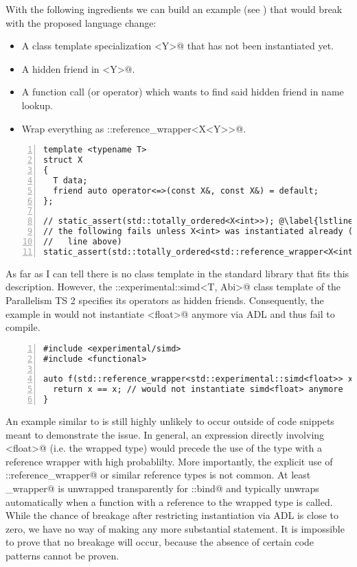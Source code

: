 With the following ingredients we can build an example (see ) that 
would break with the proposed language change:
\begin{itemize}
\item A class template specialization \codelst@X<Y>@ that has not been instantiated yet.
\item A hidden friend in \codelst@X<Y>@.
\item A function call (or operator) which wants to find said hidden friend in name lookup.
\item Wrap everything as \codelst@std::reference_wrapper<X<Y>>@.
\end{itemize}
\begin{lstlisting}[numbers=left,float={hbtp},label=lst:refwrapperproblem,caption={
\code{std::reference_wrapper} example which would fail unless 
line~\ref{lstline:refwrapperproblem0} is uncommented
}]
template <typename T>
struct X
{
  T data;
  friend auto operator<=>(const X&, const X&) = default;
};

// static_assert(std::totally_ordered<X<int>>); @\label{lstline:refwrapperproblem0}@
// the following fails unless X<int> was instantiated already (e.g. with the
//   line above)
static_assert(std::totally_ordered<std::reference_wrapper<X<int>>>);
\end{lstlisting}

As far as I can tell there is no class template in the standard library that fits this 
description. However, the \codelst@std::experimental::simd<T, Abi>@ class template of the 
Parallelism TS 2 specifies its operators as hidden friends. Consequently, the example in 
 would not instantiate \codelst@simd<float>@ anymore via ADL and thus 
fail to compile.
\begin{lstlisting}[numbers=left,float={hbtp},label=lst:refwrappersimd,caption={
Regression when combining \code{std::reference_wrapper} with 
\code{std::experimental::simd}.
}]
#include <experimental/simd>
#include <functional>

auto f(std::reference_wrapper<std::experimental::simd<float>> x) {
  return x == x; // would not instantiate simd<float> anymore
}
\end{lstlisting}

An example similar to  is still highly unlikely to occur outside of 
code snippets meant to demonstrate the issue. In general, an expression directly involving 
\codelst@simd<float>@ (i.e. the wrapped type) would precede the use of the type with a 
reference wrapper with high probablilty.
More importantly, the explicit use of \codelst@std::reference_wrapper@ or similar 
reference types is not common. At least \codelst@reference_wrapper@ is unwrapped 
transparently for \codelst@std::bind@ and typically unwraps automatically when a function 
with a reference to the wrapped type is called.
While the chance of breakage after restricting instantiation via ADL is close to zero, we 
have no way of making any more substantial statement. It is impossible to prove that no 
breakage will occur, because the absence of certain code patterns cannot be proven.


